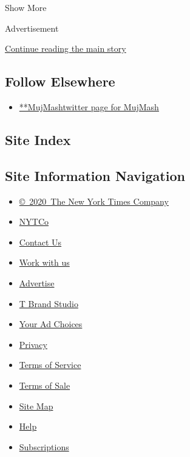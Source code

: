 Show More

Advertisement

\protect\hyperlink{after-mid2}{Continue reading the main story}

\hypertarget{follow-elsewhere}{%
\subsection{Follow Elsewhere}\label{follow-elsewhere}}

\begin{itemize}
\tightlist
\item
  \href{https://twitter.com/MujMash}{**MujMashtwitter page for MujMash}
\end{itemize}

\hypertarget{site-index}{%
\subsection{Site Index}\label{site-index}}

\hypertarget{site-information-navigation}{%
\subsection{Site Information
Navigation}\label{site-information-navigation}}

\begin{itemize}
\tightlist
\item
  \href{https://help.nytimes.com/hc/en-us/articles/115014792127-Copyright-notice}{©~2020~The
  New York Times Company}
\end{itemize}

\begin{itemize}
\tightlist
\item
  \href{https://www.nytco.com/}{NYTCo}
\item
  \href{https://help.nytimes.com/hc/en-us/articles/115015385887-Contact-Us}{Contact
  Us}
\item
  \href{https://www.nytco.com/careers/}{Work with us}
\item
  \href{https://nytmediakit.com/}{Advertise}
\item
  \href{http://www.tbrandstudio.com/}{T Brand Studio}
\item
  \href{https://www.nytimes.com/privacy/cookie-policy\#how-do-i-manage-trackers}{Your
  Ad Choices}
\item
  \href{https://www.nytimes.com/privacy}{Privacy}
\item
  \href{https://help.nytimes.com/hc/en-us/articles/115014893428-Terms-of-service}{Terms
  of Service}
\item
  \href{https://help.nytimes.com/hc/en-us/articles/115014893968-Terms-of-sale}{Terms
  of Sale}
\item
  \href{https://spiderbites.nytimes.com}{Site Map}
\item
  \href{https://help.nytimes.com/hc/en-us}{Help}
\item
  \href{https://www.nytimes.com/subscription?campaignId=37WXW}{Subscriptions}
\end{itemize}
